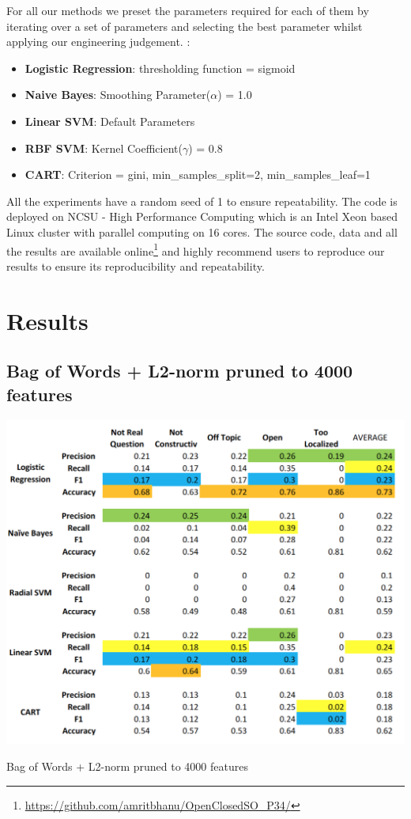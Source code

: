 \documentclass{article} %
\begin{document}
For all our methods we preset the parameters required for each of them by iterating over a set of parameters and selecting the best parameter whilst applying our engineering judgement. :

\begin{itemize}
    \item \textbf{Logistic Regression}: thresholding function =  sigmoid
    \item \textbf{Naive Bayes}: Smoothing Parameter($\alpha$) = 1.0
    \item \textbf{Linear SVM}: Default Parameters
    \item \textbf{RBF SVM}: Kernel Coefficient($\gamma$) = 0.8
    \item \textbf{CART}: Criterion = gini,  min\_samples\_split=2, min\_samples\_leaf=1 
\end{itemize}

All the experiments have a random seed of 1 to ensure repeatability. The code is deployed on NCSU - High Performance Computing which is an Intel Xeon based Linux cluster with parallel computing on 16 cores. The source code, data and all the results are available online\footnote{\url{https://github.com/amritbhanu/OpenClosedSO_P34/}} and highly recommend users to reproduce our results to ensure its reproducibility and repeatability.

\section{Results}

\subsection{Bag of Words + L2-norm pruned to 4000 features}
\begin{table}[!htpb]
    \centering
    \includegraphics[scale=0.6]{figs/BOW}
    \caption{Bag of Words + L2-norm pruned to 4000 features}
    \label{tab:bow}
\end{table}
\end{document}
